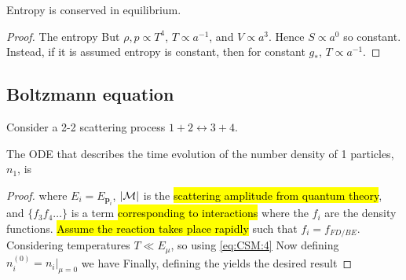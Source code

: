 \documentclass{article}
\begin{document}
\begin{prop}
Entropy is conserved in equilibrium.
\end{prop}
\begin{proof}
The entropy 
But $\rho,p \propto T^4$, $T\propto a^{-1}$, and $V\propto a^3$. Hence $S \propto a^0$ so constant. Instead, if it is assumed entropy is constant, then for constant $g_\ast$, $T\propto a^{-1}$. 
\end{proof}

\subsection{Boltzmann equation}
Consider a 2-2 scattering process $1+2 \leftrightarrow 3+4$. 

\begin{theorem}
The ODE that describes the time evolution of the number density of 1 particles, $n_1$, is 
\end{theorem}
\begin{proof}
where $E_i = E_{\bm{p}_i}$, $|\mathcal{M}|$ is the \hl{scattering amplitude from quantum theory}, and $\{ f_3 f_4 \dots \}$ is a term \hl{corresponding to interactions} where the $f_i$ are the density functions. 
\hl{Assume the reaction takes place rapidly} such that $f_i = f_{FD/BE}$. Considering temperatures $T \ll E_\mu$, so using \ref{eq:CSM:4} 
Now defining $n_i^{(0)} = n_i |_{\mu=0}$ we have 
Finally, defining the 
yields the desired result
\end{proof}
\end{document}
